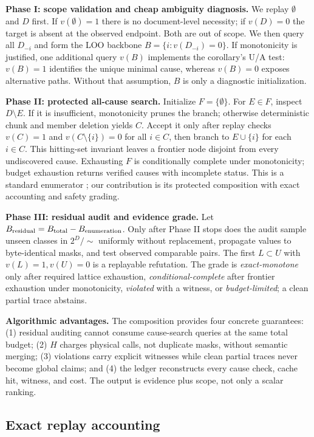 \documentclass{article}
\begin{document}
\textbf{Phase I: scope validation and cheap ambiguity diagnosis.} We replay
$\emptyset$ and $D$ first. If $v(\emptyset)=1$ there is no document-level
necessity; if $v(D)=0$ the target is absent at the observed endpoint. Both are
out of scope. We then query all $D_{-i}$ and form the LOO backbone
$B=\{i:v(D_{-i})=0\}$. If monotonicity is justified, one additional query
$v(B)$ implements the corollary's U/A test: $v(B)=1$ identifies the unique
minimal cause, whereas $v(B)=0$ exposes alternative paths. Without that
assumption, $B$ is only a diagnostic initialization.

\textbf{Phase II: protected all-cause search.} Initialize $F=\{\emptyset\}$.
For $E\in F$, inspect $D\setminus E$. If it is insufficient, monotonicity prunes
the branch; otherwise deterministic chunk and member deletion yields $C$.
Accept it only after replay checks $v(C)=1$ and
$v(C\setminus\{i\})=0$ for all $i\in C$, then branch to $E\cup\{i\}$ for each
$i\in C$. This hitting-set invariant leaves a frontier node disjoint from every
undiscovered cause. Exhausting $F$ is conditionally complete under monotonicity;
budget exhaustion returns verified causes with incomplete status. This is a
standard enumerator \cite{ignatiev2019,marquessilva2021}; our contribution is
its protected composition with exact accounting and safety grading.

\textbf{Phase III: residual audit and evidence grade.} Let
$B_{\rm residual}=B_{\rm total}-B_{\rm enumeration}$. Only after Phase II stops
does the audit sample unseen classes in $2^D/{\sim}$ uniformly without
replacement, propagate values to byte-identical masks, and test observed
comparable pairs. The first $L\subset U$ with $v(L)=1,v(U)=0$ is a replayable
refutation. The grade is \emph{exact-monotone} only after required lattice
exhaustion, \emph{conditional-complete} after frontier exhaustion under
monotonicity, \emph{violated} with a witness, or \emph{budget-limited}; a clean
partial trace abstains.

\textbf{Algorithmic advantages.} The composition provides four concrete
guarantees: (1) residual auditing cannot consume cause-search queries at the
same total budget; (2) $H$ charges physical calls, not duplicate masks, without
semantic merging; (3) violations carry explicit witnesses while clean partial
traces never become global claims; and (4) the ledger reconstructs every cause
check, cache hit, witness, and cost. The output is evidence plus scope, not only
a scalar ranking.

\subsection{Exact replay accounting}
\end{document}
